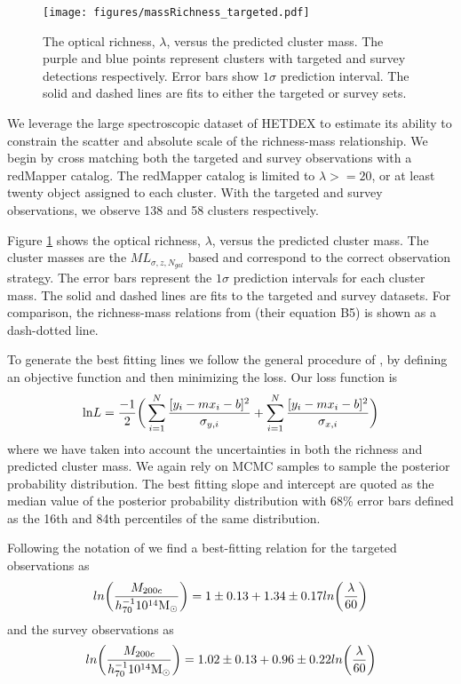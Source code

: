 \documentclass[fleqn,usenatbib]{mnras}
\begin{document}
\begin{figure} 
	\texttt{[image: figures/massRichness\_targeted.pdf]} 
	\caption{The optical richness, $\lambda$, versus the predicted cluster mass. The purple and blue points represent clusters with targeted and survey detections respectively. Error bars show $1\sigma$ prediction interval. The solid and dashed lines are fits to either the targeted or survey sets. } \label{fig:mass richness} 
\end{figure}

We leverage the large spectroscopic dataset of HETDEX to estimate its ability to constrain the scatter and absolute scale of the richness-mass relationship. We begin by cross matching both the targeted and survey observations with a redMapper catalog. The redMapper catalog is limited to $\lambda >= 20$, or at least twenty object assigned to each cluster. With the targeted and survey observations, we observe 138 and 58 clusters respectively. 

Figure \ref{fig:mass richness} shows the optical richness, $\lambda$, versus the predicted cluster mass. The cluster masses are the $ML_{\sigma, z, N_{gal}}$ based and correspond to the correct observation strategy. The error bars represent the $1\sigma$ prediction intervals for each cluster mass. The solid and dashed lines are fits to the targeted and survey datasets. For comparison, the richness-mass relations from \cite{Rykoff2012} (their equation B5) is shown as a dash-dotted line.

To generate the best fitting lines we follow the general procedure of \cite{Hogg2010}, by defining an objective function and then minimizing the loss. Our loss function is
\begin{equation}
	\mathrm{ln}L= \frac{-1}{2} \bigg{(} \sum^N_{i=1}\frac{[y_i - mx_i - b]^2}{\sigma_{y,i}} + \sum^N_{i=1}\frac{[y_i - mx_i - b]^2}{\sigma_{x,i}} \bigg{)}
\end{equation} 
where we have taken into account the uncertainties in both the richness and predicted cluster mass. We again rely on MCMC samples to sample the posterior probability distribution. The best fitting slope and intercept are quoted as the median value of the posterior probability distribution with 68\% error bars defined as the 16th and 84th percentiles of the same distribution.

Following the notation of \cite{Rykoff2012} we find a best-fitting relation for the targeted observations as
\begin{equation}
	ln\bigg{(}\frac{M_{200c}}{h_{70}^{-1} 10^{14}\hbox{$\mathrm{M}_\odot$}}\bigg{)} = 1\pm0.13 + 1.34\pm0.17 ln\bigg{(}\frac{\lambda}{60}\bigg{)} \nonumber
\end{equation}
and the survey observations as
\begin{equation}
	ln\bigg{(}\frac{M_{200c}}{h_{70}^{-1} 10^{14}\hbox{$\mathrm{M}_\odot$}}\bigg{)} = 1.02\pm0.13 + 0.96\pm0.22 ln\bigg{(}\frac{\lambda}{60}\bigg{)} \nonumber
\end{equation}
\end{document}
